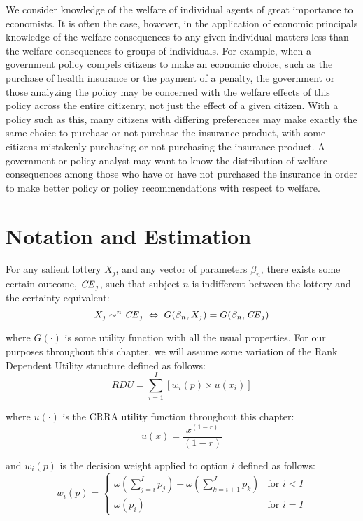 \documentclass[../main.tex]{subfiles}
\begin{document}
We consider knowledge of the welfare of individual agents of great importance to economists.
It is often the case, however, in the application of economic principals knowledge of the welfare consequences to any given individual matters less than the welfare consequences to groups of individuals.
For example, when a government policy compels citizens to make an economic choice, such as the purchase of health insurance or the payment of a penalty, the government or those analyzing the policy may be concerned with the welfare effects of this policy across the entire citizenry, not just the effect of a given citizen.
With a policy such as this, many citizens with differing preferences may make exactly the same choice to purchase or not purchase the insurance product, with some citizens mistakenly purchasing or not purchasing the insurance product.
A government or policy analyst may want to know the distribution of welfare consequences among those who have or have not purchased the insurance in order to make better policy or policy recommendations with respect to welfare.

\section{Notation and Estimation} \label{ssec:Notation}

For any salient lottery $X_j$, and any vector of parameters $\beta_n$, there exists some certain outcome, $\mathit{CE}_j$, such that subject $n$ is indifferent between the lottery and the certainty equivalent:
\begin{equation}
	\label{eq3:CE.indiff}
	X_j \sim^n {\mathit{CE}}_j \;\Leftrightarrow\; G(\beta_n,X_j) = G(\beta_n, {\mathit{CE}}_j)
\end{equation}

\noindent where $G(\cdot)$ is some utility function with all the usual properties.
For our purposes throughout this chapter, we will assume some variation of the Rank Dependent Utility structure defined as follows:
\begin{equation}
	\label{eq3:RDU}
	RDU = \sum_{i=1}^{I} \left[ w_i(p) \times u(x_i) \right]
\end{equation}

\noindent where $u(\cdot)$ is the CRRA utility function throughout this chapter:
\begin{equation}
	\label{eq3:CRRA}
	u(x) = \frac{x^{(1-r)}}{(1-r)}
\end{equation}

\noindent and $w_i(p)$ is the decision weight applied to option $i$ defined as follows:
\begin{equation}
	\label{eq3:dweight}
	w_i(p) =
	\begin{cases}
		\omega\left(\displaystyle\sum_{j=i}^I p_j\right) - \omega\left(\displaystyle\sum_{k=i+1}^J p_k\right) & \text{for } i<I \\
		\omega(p_i) & \text{for } i = I
	\end{cases}
\end{equation}
\end{document}
